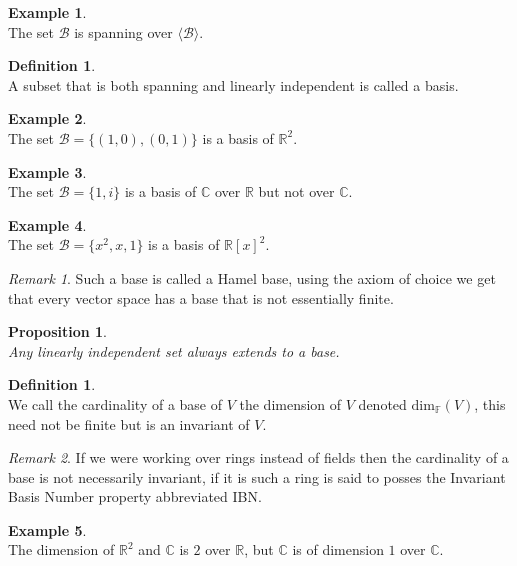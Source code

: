 \documentclass[12pt]{article}
\newtheorem{prop}[theorem]{Proposition}
\theoremstyle{definition}
\newtheorem{definition}[theorem]{Definition}
\newtheorem*{example}{Example}
\theoremstyle{remark}
\newtheorem*{remark}{Remark}
\theoremstyle{plain}
\begin{document}
\begin{example}\leavevmode \\
    The set $\mathcal{B}$ is spanning over $\langle \mathcal{B}\rangle$.
\end{example}
\begin{definition}\leavevmode \\
    A subset that is both spanning and linearly independent is called a basis.
\end{definition}
\begin{example}\leavevmode \\
    The set $\mathcal{B}=\{(1,0),(0,1)\}$ is a basis of $\mathbb{R}^2$.
\end{example}
\begin{example}\leavevmode \\
    The set $\mathcal{B}=\{ 1,i\}$ is a basis of $\mathbb{C}$ over $\mathbb{R}$ but not over $\mathbb{C}$.
\end{example}
\begin{example}\leavevmode \\
    The set $\mathcal{B}=\{ x^2,x,1\}$ is a basis of $\mathbb{R}[x]^2$.
\end{example}
\begin{remark}
    Such a base is called a Hamel base, using the axiom of choice we get that every vector space has a base that is not essentially finite.
\end{remark}
\begin{prop}\leavevmode \\
    Any linearly independent set always extends to a base.
\end{prop}
\begin{definition}\leavevmode \\
    We call the cardinality of a base of $V$ the dimension of $V$ denoted $\mathrm{dim}_\mathbb{F}(V)$, this need not be finite but is an invariant of $V$.
\end{definition}
\begin{remark}
    If we were working over rings instead of fields then the cardinality of a base is not necessarily invariant, if it is such a ring is said to posses the Invariant Basis Number property abbreviated IBN.
\end{remark}
\begin{example}\leavevmode \\
    The dimension of $\mathbb{R}^2$ and $\mathbb{C}$ is $2$ over $\mathbb{R}$, but $\mathbb{C}$ is of dimension $1$ over $\mathbb{C}$.
\end{example}
\end{document}
